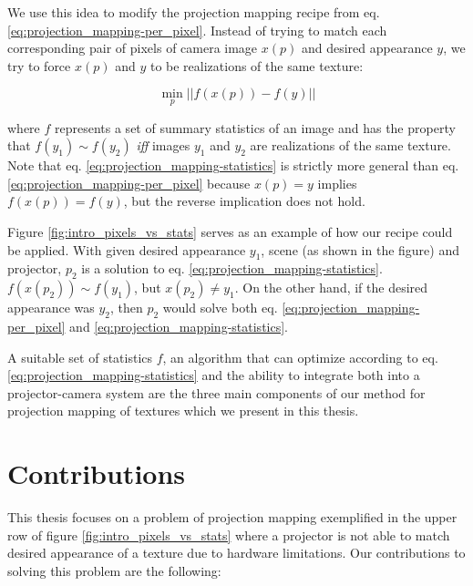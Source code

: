 We use this idea to modify the projection mapping recipe from eq. \ref{eq:projection_mapping-per_pixel}. Instead of trying to match each corresponding pair of pixels of camera image \(x(p)\) and desired appearance \(y\), we try to force \(x(p)\) and \(y\) to be realizations of the same texture:

\begin{equation}
    \label{eq:projection_mapping-statistics}
    \min_p || f(x(p)) - f(y) ||
\end{equation}

where \(f\) represents a set of summary statistics of an image and has the property that \(f(y_1) \sim f(y_2)\) \textit{iff} images \(y_1\) and \(y_2\) are realizations of the same texture. Note that eq. \ref{eq:projection_mapping-statistics} is strictly more general than eq. \ref{eq:projection_mapping-per_pixel} because \(x(p) = y\) implies \(f(x(p)) = f(y)\), but the reverse implication does not hold.

Figure \ref{fig:intro_pixels_vs_stats} serves as an example of how our recipe could be applied. With given desired appearance \(y_1\), scene (as shown in the figure) and projector, \(p_2\) is a solution to eq. \ref{eq:projection_mapping-statistics}. \(f(x(p_2)) \sim f(y_1)\), but \(x(p_2) \neq y_1\). On the other hand, if the desired appearance was \(y_2\), then \(p_2\) would solve both eq. \ref{eq:projection_mapping-per_pixel} and \ref{eq:projection_mapping-statistics}.

A suitable set of statistics \(f\), an algorithm that can optimize according to eq. \ref{eq:projection_mapping-statistics} and the ability to integrate both into a projector-camera system are the three main components of our method for projection mapping of textures which we present in this thesis.

\section{Contributions}
\label{section:intro-contributions}

This thesis focuses on a problem of projection mapping exemplified in the upper row of figure \ref{fig:intro_pixels_vs_stats} where a projector is not able to match desired appearance of a texture due to hardware limitations. Our contributions to solving this problem are the following:

